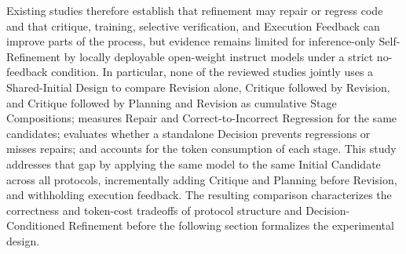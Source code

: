Existing studies therefore establish that refinement may repair or regress code and that critique, training, selective verification, and Execution Feedback can improve parts of the process, but evidence remains limited for inference-only Self-Refinement by locally deployable open-weight instruct models under a strict no-feedback condition.
In particular, none of the reviewed studies jointly uses a Shared-Initial Design to compare Revision alone, Critique followed by Revision, and Critique followed by Planning and Revision as cumulative Stage Compositions; measures Repair and Correct-to-Incorrect Regression for the same candidates; evaluates whether a standalone Decision prevents regressions or misses repairs; and accounts for the token consumption of each stage.
This study addresses that gap by applying the same model to the same Initial Candidate across all protocols, incrementally adding Critique and Planning before Revision, and withholding execution feedback.
The resulting comparison characterizes the correctness and token-cost tradeoffs of protocol structure and Decision-Conditioned Refinement before the following section formalizes the experimental design.
